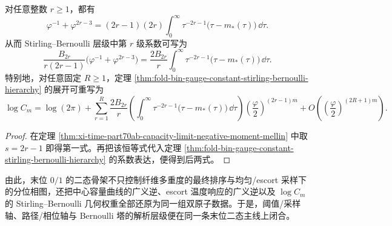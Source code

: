 \begin{corollary}\label{cor:xi-time-part70ab-bernoulli-hierarchy-capacity-interpretation}
对任意整数 \(r\ge 1\)，都有
\[
\varphi^{-1}+\varphi^{2r-3}
=
(2r-1)(2r)\int_0^\infty \tau^{-2r-1}\bigl(\tau-m_\ast(\tau)\bigr)\,\dd\tau.
\]
从而 Stirling--Bernoulli 层级中第 \(r\) 级系数可写为
\[
\frac{B_{2r}}{r(2r-1)}
\bigl(\varphi^{-1}+\varphi^{2r-3}\bigr)
=
\frac{2B_{2r}}{r}
\int_0^\infty \tau^{-2r-1}\bigl(\tau-m_\ast(\tau)\bigr)\,\dd\tau.
\]
特别地，对任意固定 \(R\ge 1\)，定理 \ref{thm:fold-bin-gauge-constant-stirling-bernoulli-hierarchy} 的展开可重写为
\[
\log C_m
=
\log(2\pi)
+
\sum_{r=1}^{R}
\frac{2B_{2r}}{r}
\left(
\int_0^\infty \tau^{-2r-1}\bigl(\tau-m_\ast(\tau)\bigr)\,\dd\tau
\right)
\left(\frac{\varphi}{2}\right)^{(2r-1)m}
+
O\!\left(\left(\frac{\varphi}{2}\right)^{(2R+1)m}\right).
\]
\end{corollary}
\begin{proof}
在定理 \ref{thm:xi-time-part70ab-capacity-limit-negative-moment-mellin} 中取 \(s=2r-1\) 即得第一式。再把该恒等式代入定理 \ref{thm:fold-bin-gauge-constant-stirling-bernoulli-hierarchy} 的系数表达，便得到后两式。
\end{proof}

\noindent
由此，末位 \(0/1\) 的二态骨架不只控制纤维多重度的最终排序与均匀/escort 采样下的分位相图，还把中心容量曲线的广义逆、escort 温度响应的广义逆以及 \(\log C_m\) 的 Stirling--Bernoulli 几何权重全部还原为同一组双原子数据。于是，阈值/采样轴、路径/相位轴与 Bernoulli 塔的解析层级便在同一条末位二态主线上闭合。

\endinput
